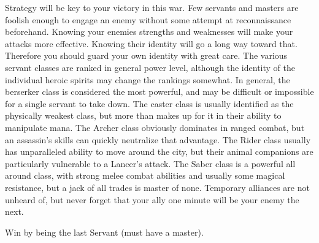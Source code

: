 \documentclass[blue]{FateDarkDawn}
\begin{document}
Strategy will be key to your victory in this war. Few servants and masters are foolish enough to engage an enemy without some attempt at reconnaissance beforehand. Knowing your enemies strengths and weaknesses will make your attacks more effective. Knowing their identity will go a long way toward that. Therefore you should guard your own identity with great care. The various servant classes are ranked in general power level, although the identity of the individual heroic spirits may change the rankings somewhat. In general, the berserker class is considered the most powerful, and may be difficult or impossible for a single servant to take down. The caster class is usually identified as the physically weakest class, but more than makes up for it in their ability to manipulate mana. The Archer class obviously dominates in ranged combat, but an assassin's skills can quickly neutralize that advantage. The Rider class usually has unparalleled ability to move around the city, but their animal companions are particularly vulnerable to a Lancer's attack. The Saber class is a powerful all around class, with strong melee combat abilities and usually some magical resistance, but a jack of all trades is master of none. Temporary alliances are not unheard of, but never forget that your ally one minute will be your enemy the next.


\begin{itemz}[Goals]
	\item Win \iGrail{} by being the last Servant (must have a master).
\end{itemz}
\end{document}
